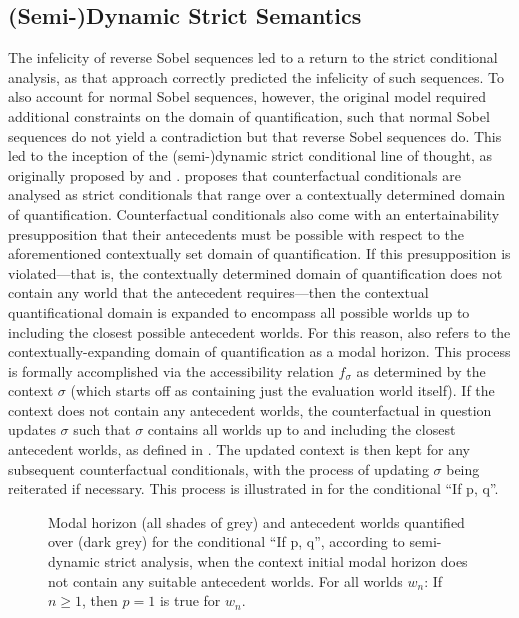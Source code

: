 \subsection{(Semi-)Dynamic Strict Semantics}
The infelicity of reverse Sobel sequences led to a return to the strict conditional analysis, as that approach correctly predicted the infelicity of such sequences. To also account for normal Sobel sequences, however, the original model required additional constraints on the domain of quantification, such that normal Sobel sequences do not yield a contradiction but that reverse Sobel sequences do. This led to the inception of the (semi-)dynamic strict conditional line of thought, as originally proposed by \textcite{Fintel2001} and \textcite{Gillies2007}. \textcite{Fintel2001} proposes that counterfactual conditionals are analysed as strict conditionals that range over a contextually determined domain of quantification. Counterfactual conditionals also come with an entertainability presupposition that their antecedents must be possible with respect to the aforementioned contextually set domain of quantification. If this presupposition is violated---that is, the contextually determined domain of quantification does not contain any world that the antecedent requires---then the contextual quantificational domain is expanded to encompass all possible worlds up to including the closest possible antecedent worlds. For this reason, \textcite{Fintel2001} also refers to the contextually-expanding domain of quantification as a modal horizon. This process is formally accomplished via the accessibility relation $f_\sigma$ as determined by the context $\sigma$ (which starts off as containing just the evaluation world itself). If the context does not contain any antecedent worlds, the counterfactual in question updates $\sigma$ such that $\sigma$ contains all worlds up to and including the closest antecedent worlds, as defined in . The updated context is then kept for any subsequent counterfactual conditionals, with the process of updating $\sigma$ being reiterated if necessary.\vspace{-5mm}
\pex{}\vspace*{-2mm}
\xe
This process is illustrated in  for the conditional \enquote{If p, q}.\vspace{-2mm}
\begin{figure}[!htb]
\resizebox{0.95\textwidth}{!}{}
\caption{Modal horizon (all shades of grey) and antecedent worlds quantified over (dark grey) for the conditional \enquote{If p, q}, according to  semi-dynamic strict analysis, when the context initial modal horizon does not contain any suitable antecedent worlds. For all worlds $w_n$: If $n\geqslant1$, then $p=1$ is true for $w_n$.}
\end{figure}

